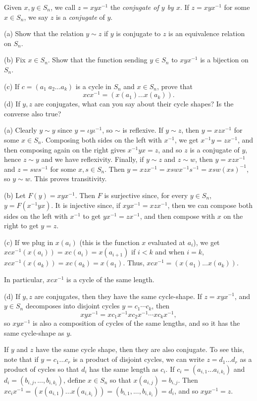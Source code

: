 \documentclass[11pt,dvipsnames]{book}
\numberwithin{figure}{section} %
\numberwithin{table}{section} %
\begin{document}
\begin{exercise}
 Given $x,y\in S_{n}$, we call $z=xyx^{-1}$ the {\it conjugate of $y$ by $x$}. If $z=xyx^{-1}$ for some $x\in S_{n}$, we say $z$ is a {\it conjugate} of $y$. 

(a) Show that the relation $y\sim z$ if $y$ is conjugate to $z$ is an equivalence relation on $S_{n}$. 

(b) Fix $x\in S_{n}$. Show that the function sending $y\in S_{n}$ to $xyx^{-1}$ is a bijection on $S_{n}$. 

(c) If $c=(a_{1} \; a_{2}...a_{k})$ is a cycle in $S_{n}$ and $x\in S_{n}$, prove that 
\[
xcx^{-1}=(x(a_{1})...x(a_{k})). 
\]
(d) If $y,z$ are conjugates, what can you say about their cycle shapes? Is the converse also true?



\begin{solution}
(a) Clearly $y\sim y$ since $y=\iota y\iota^{-1}$, so $\sim$ is reflexive. If $y\sim z$, then $y=xzx^{-1}$ for some $x\in S_{n}$. Composing both sides on the left with $x^{-1}$, we get $x^{-1}y=zx^{-1}$, and then composing again on the right gives $x^{-1}yx=z$, and so $z$ is a conjugate of $y$, hence $z\sim y$ and we have reflexivity. Finally, if $y\sim z$ and $z\sim w$, then $y=xzx^{-1}$ and $z=sws^{-1}$ for some $x,s\in S_{n}$. Then $y=xzx^{-1} = xswx^{-1}s^{-1} = xsw(xs)^{-1}$, so $y\sim w$. This proves transitivity.

(b) Let $F(y)=xyx^{-1}$. Then $F$ is surjective since, for every $y\in S_{n}$, $y=F(x^{-1}yx)$. It is injective since, if $xyx^{-1}=xzx^{-1}$, then we can compose both sides on the left with $x^{-1}$ to get $yx^{-1}=zx^{-1}$, and then compose with $x$ on the right to get $y=z$. 

(c) If we plug in $x(a_{i})$ (this is the function $x$ evaluated at $a_{i}$), we get $xcx^{-1}(x(a_{i}))=xc(a_{i})=x(a_{i+1})$ if $i<k$ and when $i=k$, $xcx^{-1}(x(a_{k}))=xc(a_{k})=x(a_{1})$. Thus, $xcx^{-1}=(x(a_{1})...x(a_{k}))$. 

In particular, $xcx^{-1}$ is a cycle of the same length.

(d) If $y,z$ are conjugates, then they have the same cycle-shape. If $z=xyx^{-1}$, and $y\in S_{n}$ decomposes into disjoint cycles $y=c_{1}\cdots c_{k}$, then 
\[
xyx^{-1}=xc_{1}x^{-1} xc_{2}x^{-1}\cdots xc_{k}x^{-1}, \]
so $xyx^{-1}$ is also a composition of cycles of the same lengths, and so it has the same cycle-shape as $y$. 

If $y$ and $z$ have the same cycle shape, then they are also conjugate. To see this, note that if $y=c_1...c_{r}$ is a product of disjoint cycles, we can write $z=d_{1}...d_{r}$ as a product of cycles so that $d_{i}$ has the same length as $c_{i}$. If $c_{i}=(a_{i,1}...a_{i,k_i})$ and $d_{i}=(b_{i,j},...,b_{i,k_{i}})$, define $x\in S_{n}$ so that $x(a_{i,j})=b_{i,j}$. Then $xc_ix^{-1}=(x(a_{i,1})...x(a_{i,k_i}))=(b_{i,1},...,b_{i,k_{i}})=d_i$, and so $xyx^{-1}=z$. 
\end{solution}







\end{exercise}
\end{document}
